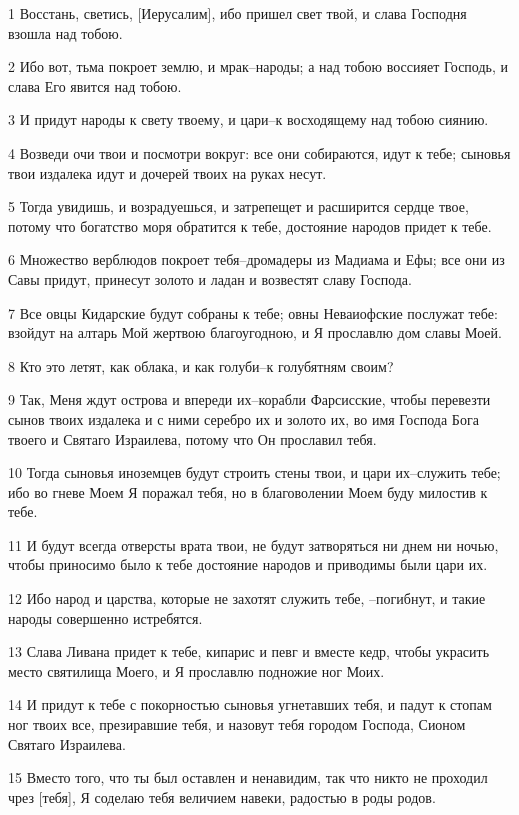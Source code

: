 \par 1 Восстань, светись, [Иерусалим], ибо пришел свет твой, и слава Господня взошла над тобою.
\par 2 Ибо вот, тьма покроет землю, и мрак--народы; а над тобою воссияет Господь, и слава Его явится над тобою.
\par 3 И придут народы к свету твоему, и цари--к восходящему над тобою сиянию.
\par 4 Возведи очи твои и посмотри вокруг: все они собираются, идут к тебе; сыновья твои издалека идут и дочерей твоих на руках несут.
\par 5 Тогда увидишь, и возрадуешься, и затрепещет и расширится сердце твое, потому что богатство моря обратится к тебе, достояние народов придет к тебе.
\par 6 Множество верблюдов покроет тебя--дромадеры из Мадиама и Ефы; все они из Савы придут, принесут золото и ладан и возвестят славу Господа.
\par 7 Все овцы Кидарские будут собраны к тебе; овны Неваиофские послужат тебе: взойдут на алтарь Мой жертвою благоугодною, и Я прославлю дом славы Моей.
\par 8 Кто это летят, как облака, и как голуби--к голубятням своим?
\par 9 Так, Меня ждут острова и впереди их--корабли Фарсисские, чтобы перевезти сынов твоих издалека и с ними серебро их и золото их, во имя Господа Бога твоего и Святаго Израилева, потому что Он прославил тебя.
\par 10 Тогда сыновья иноземцев будут строить стены твои, и цари их--служить тебе; ибо во гневе Моем Я поражал тебя, но в благоволении Моем буду милостив к тебе.
\par 11 И будут всегда отверсты врата твои, не будут затворяться ни днем ни ночью, чтобы приносимо было к тебе достояние народов и приводимы были цари их.
\par 12 Ибо народ и царства, которые не захотят служить тебе, --погибнут, и такие народы совершенно истребятся.
\par 13 Слава Ливана придет к тебе, кипарис и певг и вместе кедр, чтобы украсить место святилища Моего, и Я прославлю подножие ног Моих.
\par 14 И придут к тебе с покорностью сыновья угнетавших тебя, и падут к стопам ног твоих все, презиравшие тебя, и назовут тебя городом Господа, Сионом Святаго Израилева.
\par 15 Вместо того, что ты был оставлен и ненавидим, так что никто не проходил чрез [тебя], Я соделаю тебя величием навеки, радостью в роды родов.
